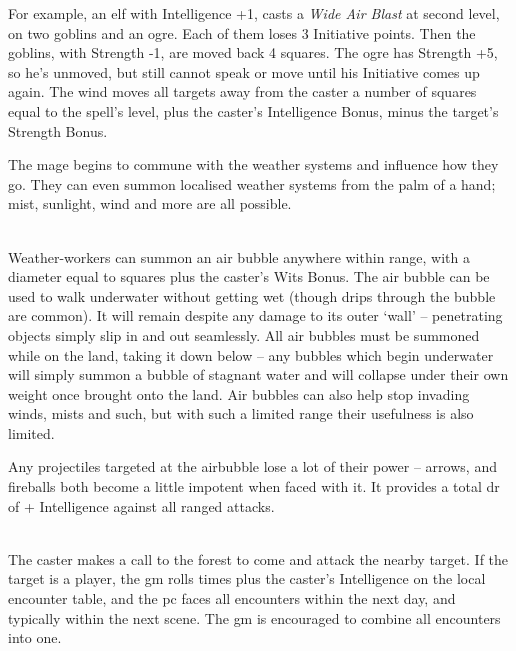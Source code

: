 \begin{multicols}{2}
{For example, an elf with Intelligence +1, casts a \textit{Wide Air Blast} at second level, on two goblins and an ogre.
Each of them loses 3 Initiative points.
Then the goblins, with Strength -1, are moved back 4 squares.
The ogre has Strength +5, so he's unmoved, but still cannot speak or move until his Initiative comes up again.
}{
The wind moves all targets away from the caster a number of squares equal to the spell's level, plus the caster's Intelligence Bonus, minus the target's Strength Bonus.
}

\spelllevel

The mage begins to commune with the weather systems and influence how they go. They can even summon localised weather systems from the palm of a hand; mist, sunlight, wind and more are all possible.

\\
Weather-workers can summon an air bubble anywhere within range, with a diameter equal to  squares plus the caster's Wits Bonus. The air bubble can be used to walk underwater without getting wet (though drips through the bubble are common). It will remain despite any damage to its outer `wall' -- penetrating objects simply slip in and out seamlessly. All air bubbles must be summoned while on the land, taking it down below -- any bubbles which begin underwater will simply summon a bubble of stagnant water and will collapse under their own weight once brought onto the land. Air bubbles can also help stop invading winds, mists and such, but with such a limited range their usefulness is also limited.

Any projectiles targeted at the airbubble lose a lot of their power -- arrows, and fireballs both become a little impotent when faced with it.
It provides a total \gls{dr} of  + Intelligence against all ranged attacks.

\spelllevel

\\
The caster makes a call to the forest to come and attack the nearby target.  If the target is a player, the \gls{gm} rolls  times plus the caster's Intelligence on the local encounter table, and the \gls{pc} faces all encounters within the next day, and typically within the next scene.  The \gls{gm} is encouraged to combine all encounters into one.


\end{multicols}
